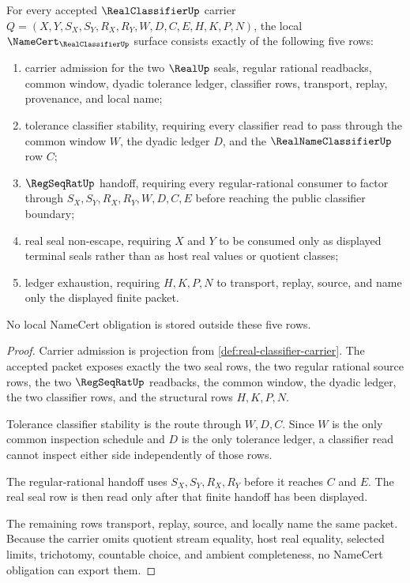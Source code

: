 \begin{theorem}
\label{thm:real-classifier-namecert-obligations}
For every accepted $\RealClassifierUp$ carrier $Q=(X,Y,S_X,S_Y,R_X,R_Y,W,D,C,E,H,K,P,N)$, the local $\NameCert_{\RealClassifierUp}$ surface consists exactly of the following five rows:
\begin{enumerate}
\item carrier admission for the two $\RealUp$ seals, regular rational readbacks, common window, dyadic tolerance ledger, classifier rows, transport, replay, provenance, and local name;
\item tolerance classifier stability, requiring every classifier read to pass through the common window $W$, the dyadic ledger $D$, and the $\RealNameClassifierUp$ row $C$;
\item $\RegSeqRatUp$ handoff, requiring every regular-rational consumer to factor through $S_X,S_Y,R_X,R_Y,W,D,C,E$ before reaching the public classifier boundary;
\item real seal non-escape, requiring $X$ and $Y$ to be consumed only as displayed terminal seals rather than as host real values or quotient classes;
\item ledger exhaustion, requiring $H,K,P,N$ to transport, replay, source, and name only the displayed finite packet.
\end{enumerate}
No local NameCert obligation is stored outside these five rows.
\end{theorem}
\begin{proof}
Carrier admission is projection from \autoref{def:real-classifier-carrier}. The accepted packet exposes exactly the two seal rows, the two regular rational source rows, the two $\RegSeqRatUp$ readbacks, the common window, the dyadic ledger, the two classifier rows, and the structural rows $H,K,P,N$.

Tolerance classifier stability is the route through $W,D,C$. Since $W$ is the only common inspection schedule and $D$ is the only tolerance ledger, a classifier read cannot inspect either side independently of those rows.

The regular-rational handoff uses $S_X,S_Y,R_X,R_Y$ before it reaches $C$ and $E$. The real seal row is then read only after that finite handoff has been displayed.

The remaining rows transport, replay, source, and locally name the same packet. Because the carrier omits quotient stream equality, host real equality, selected limits, trichotomy, countable choice, and ambient completeness, no NameCert obligation can export them.
\end{proof}

